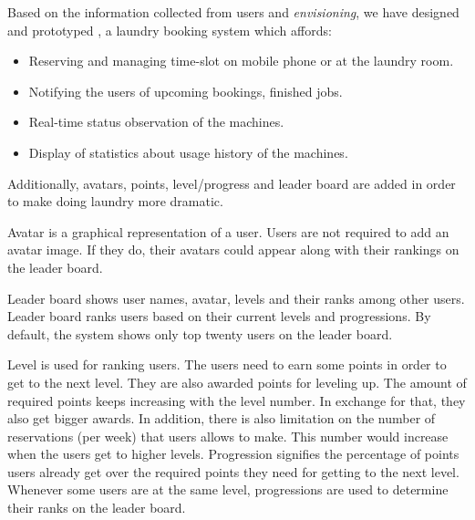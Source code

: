 Based on the information collected from users and \emph{envisioning}, we have designed and prototyped {\toolname}, a laundry booking system which affords:
\begin{itemize}
\item Reserving and managing time-slot on mobile phone or at the laundry room.
\item Notifying the users of upcoming bookings, finished jobs.
\item Real-time status observation of the machines.
\item Display of statistics about usage history of the machines.
\end{itemize}
Additionally, avatars, points, level/progress and leader board are added in order to make doing laundry more dramatic.

Avatar is a graphical representation of a user. Users are not required to add an avatar image. If they do, their avatars could appear along with their rankings on the leader board. 

Leader board shows user names, avatar, levels and their ranks among other users. Leader board ranks users based on their current levels and progressions. By default, the system shows only top twenty users on the leader board.

Level is used for ranking users. The users need to earn some points in order to get to the next level. They are also awarded points for leveling up. The amount of required points keeps increasing with the level number. In exchange for that, they also get bigger awards. In addition, there is also limitation on the number of reservations (per week) that users allows to make. This number would increase when the users get to higher levels. Progression signifies the percentage of points users already get over the required points they need for getting to the next level. Whenever some users are at the same level, progressions are used to determine their ranks on the leader board.
 

